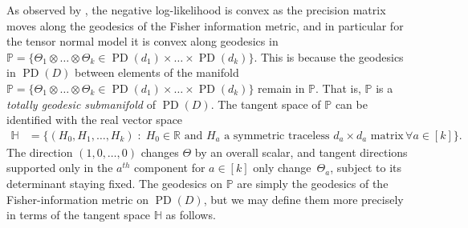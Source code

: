 \documentclass[aos]{imsart}
\theoremstyle{definition}
\numberwithin{equation}{section}
\DeclareMathOperator{\PD}{PD}
\newcommand{\R}{{\mathbb{R}}}
\renewcommand{\P}{{\mathbb{P}}}
\renewcommand{\H}{{\mathbb{H}}}
\newcommand{\ot}{\otimes}
\begin{document}
As observed by \cite{wiesel2012geodesic}, the negative log-likelihood is convex as the precision matrix moves along the geodesics of the Fisher information metric, and in particular for the tensor normal model it is convex along geodesics in $\P = \{ \Theta_1 \ot \dots \ot \Theta_k \in \PD(d_1) \times \dots \times \PD(d_k) \}$. This is because the geodesics in $\PD(D)$ between elements of the manifold $\P = \{ \Theta_1 \ot \dots \ot \Theta_k \in \PD(d_1) \times \dots \times \PD(d_k) \}$ remain in $\P$. That is, $\P$ is a \emph{totally geodesic submanifold} of $\PD(D)$.  The tangent space of $\P$ can be identified with the real vector space
\begin{align*}
  \H &= \{ (H_0, H_1,\dots,H_k) \;:\; H_0 \in \R \text{ and }H_a \text{ a symmetric traceless $d_a \times d_a$ matrix} \, \forall a \in [k]  \}.
\end{align*}
The direction $(1, 0, \dots, 0)$ changes $\Theta$ by an overall scalar, and tangent directions supported only in the $a^{th}$ component for $a \in [k]$ only change~$\Theta_a$, subject to its determinant staying fixed. The geodesics on $\P$ are simply the geodesics of the Fisher-information metric on $\PD(D)$, but we may define them more precisely in terms of the tangent space $\H$ as follows.
\end{document}
